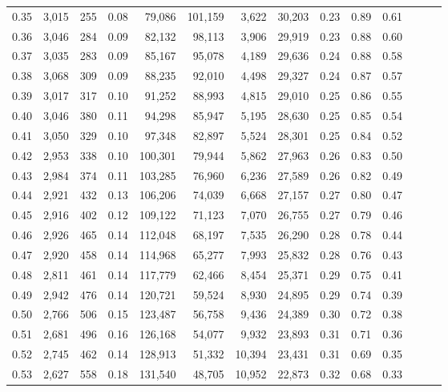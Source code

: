 \begin{tabular}{rrrrrrrrrrrrrr}
0.35 &  3,015 &    255 &  0.08 &   79,086 &  101,159 &   3,622 &  30,203 &  0.23 &  0.89 &      0.61 \\
0.36 &  3,046 &    284 &  0.09 &   82,132 &   98,113 &   3,906 &  29,919 &  0.23 &  0.88 &      0.60 \\
0.37 &  3,035 &    283 &  0.09 &   85,167 &   95,078 &   4,189 &  29,636 &  0.24 &  0.88 &      0.58 \\
0.38 &  3,068 &    309 &  0.09 &   88,235 &   92,010 &   4,498 &  29,327 &  0.24 &  0.87 &      0.57 \\
0.39 &  3,017 &    317 &  0.10 &   91,252 &   88,993 &   4,815 &  29,010 &  0.25 &  0.86 &      0.55 \\
0.40 &  3,046 &    380 &  0.11 &   94,298 &   85,947 &   5,195 &  28,630 &  0.25 &  0.85 &      0.54 \\
0.41 &  3,050 &    329 &  0.10 &   97,348 &   82,897 &   5,524 &  28,301 &  0.25 &  0.84 &      0.52 \\
0.42 &  2,953 &    338 &  0.10 &  100,301 &   79,944 &   5,862 &  27,963 &  0.26 &  0.83 &      0.50 \\
0.43 &  2,984 &    374 &  0.11 &  103,285 &   76,960 &   6,236 &  27,589 &  0.26 &  0.82 &      0.49 \\
0.44 &  2,921 &    432 &  0.13 &  106,206 &   74,039 &   6,668 &  27,157 &  0.27 &  0.80 &      0.47 \\
0.45 &  2,916 &    402 &  0.12 &  109,122 &   71,123 &   7,070 &  26,755 &  0.27 &  0.79 &      0.46 \\
0.46 &  2,926 &    465 &  0.14 &  112,048 &   68,197 &   7,535 &  26,290 &  0.28 &  0.78 &      0.44 \\
0.47 &  2,920 &    458 &  0.14 &  114,968 &   65,277 &   7,993 &  25,832 &  0.28 &  0.76 &      0.43 \\
0.48 &  2,811 &    461 &  0.14 &  117,779 &   62,466 &   8,454 &  25,371 &  0.29 &  0.75 &      0.41 \\
0.49 &  2,942 &    476 &  0.14 &  120,721 &   59,524 &   8,930 &  24,895 &  0.29 &  0.74 &      0.39 \\
0.50 &  2,766 &    506 &  0.15 &  123,487 &   56,758 &   9,436 &  24,389 &  0.30 &  0.72 &      0.38 \\
0.51 &  2,681 &    496 &  0.16 &  126,168 &   54,077 &   9,932 &  23,893 &  0.31 &  0.71 &      0.36 \\
0.52 &  2,745 &    462 &  0.14 &  128,913 &   51,332 &  10,394 &  23,431 &  0.31 &  0.69 &      0.35 \\
0.53 &  2,627 &    558 &  0.18 &  131,540 &   48,705 &  10,952 &  22,873 &  0.32 &  0.68 &      0.33 \\

\end{tabular}
